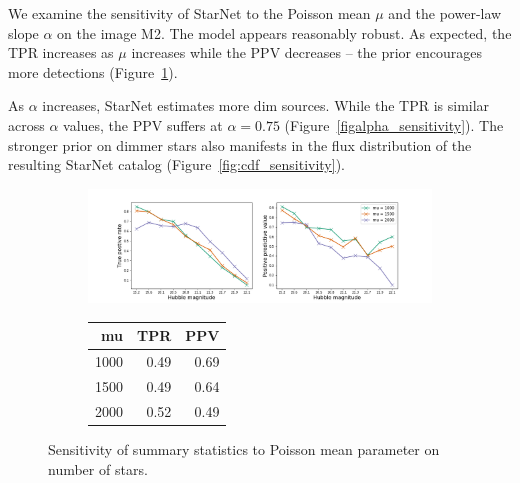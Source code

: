 We examine the sensitivity of StarNet to the Poisson mean $\mu$ and the power-law slope $\alpha$ on the image M2. 
The model appears reasonably robust. 
As expected, the TPR increases as $\mu$ increases while the PPV decreases  -- the prior encourages more detections (Figure~\ref{fig:mu_sensitivity}). 

As $\alpha$ increases, StarNet estimates more dim sources. While the TPR is similar across $\alpha$ values, the PPV suffers at $\alpha = 0.75$ (Figure~\ref{figalpha_sensitivity}).
The stronger prior on dimmer stars also manifests in the flux distribution of the resulting StarNet catalog (Figure~\ref{fig:cdf_sensitivity}). 

\begin{figure}[ht]
\begin{subfigure}{\textwidth}
\centering
\includegraphics[width = \textwidth]{figures/prior_mu_sensitivty.png}
\end{subfigure}
\begin{subfigure}{\textwidth}
\begin{center}
\begin{tabular}{rrr}
\toprule
     mu &   TPR &   PPV \\
\midrule
 1000&  0.49 &  0.69 \\
 1500&  0.49 &  0.64 \\
 2000 &  0.52 &  0.49 \\
\bottomrule
\end{tabular}
\par\vspace{0pt}
\end{center}
\end{subfigure}\hfill
\caption{Sensitivity of summary statistics to Poisson mean parameter on number of stars. }
\label{fig:mu_sensitivity}
\end{figure}


